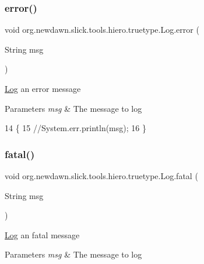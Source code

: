 \subsubsection{\texorpdfstring{error()}{error()}}
{\footnotesize\ttfamily void org.\+newdawn.\+slick.\+tools.\+hiero.\+truetype.\+Log.\+error (\begin{DoxyParamCaption}\item[{String}]{msg }\end{DoxyParamCaption})\hspace{0.3cm}{\ttfamily [inline]}}

\mbox{\hyperlink{classorg_1_1newdawn_1_1slick_1_1tools_1_1hiero_1_1truetype_1_1_log}{Log}} an error message


\begin{DoxyParams}{Parameters}
{\em msg} & The message to log \\
\hline
\end{DoxyParams}

\begin{DoxyCode}
14                                   \{
15         \textcolor{comment}{//System.err.println(msg);}
16     \}
\end{DoxyCode}
\mbox{\label{classorg_1_1newdawn_1_1slick_1_1tools_1_1hiero_1_1truetype_1_1_log_a4f18f464bfc9d54f1b6d853b421e8eb5}} 
\subsubsection{\texorpdfstring{fatal()}{fatal()}}
{\footnotesize\ttfamily void org.\+newdawn.\+slick.\+tools.\+hiero.\+truetype.\+Log.\+fatal (\begin{DoxyParamCaption}\item[{String}]{msg }\end{DoxyParamCaption})\hspace{0.3cm}{\ttfamily [inline]}}

\mbox{\hyperlink{classorg_1_1newdawn_1_1slick_1_1tools_1_1hiero_1_1truetype_1_1_log}{Log}} an fatal message


\begin{DoxyParams}{Parameters}
{\em msg} & The message to log \\
\hline
\end{DoxyParams}

